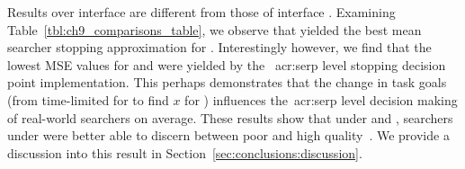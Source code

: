 Results over interface  are different from those of interface . Examining Table~\ref{tbl:ch9_comparisons_table}, we observe that  yielded the best mean searcher stopping approximation for . Interestingly however, we find that the lowest MSE values for  and  were yielded by the ~\gls{acr:serp} level stopping decision point implementation. This perhaps demonstrates that the change in task goals (from time-limited for  to find $x$ for ) influences the~\gls{acr:serp} level decision making of real-world searchers on average. These results show that under  and , searchers under  were better able to discern between poor and high quality~. We provide a discussion into this result in Section~\ref{sec:conclusions:discussion}.


